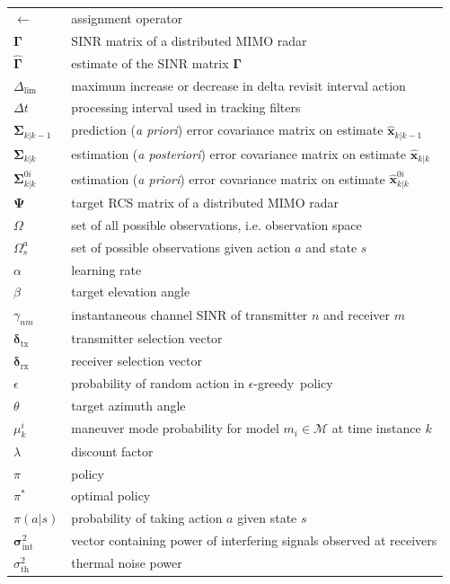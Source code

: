 \documentclass[english, 12pt, a4paper, elec, utf8, a-1b, online]{aaltothesis}
\numberwithin{equation}{section}
\renewcommand{\vec}[1]{\mathbf{#1}}
\newcommand{\Os}{\Omega}
\newcommand{\egreedy}{$\epsilon$-greedy~}
\newcommand{\xprior}{\hat{\vec{x}}_{k|k-1}}
\newcommand{\xpost}{\hat{\vec{x}}_{k|k}}
\newcommand{\priorecov}{\boldsymbol{\Sigma}_{k|k-1}}
\newcommand{\postecov}{\boldsymbol{\Sigma}_{k|k}}
\newcommand{\modeprob}{\mu_k^i}
\newcommand{\xmxinitcurr}{\hat{\vec{x}}^{0i}_{k|k}}
\newcommand{\ecovmxinitcurr}{\bm{\Sigma}^{0i}_{k|k}}
\newcommand{\deltalim}{\Delta_\text{lim}}
\def\prior{\textit{a priori}}
\def\post{\textit{a posteriori}}
\newcommand{\mimm}{\mathcal{M}}
\newcommand{\dt}{\Delta t}
\newcommand{\thnoise}{\sigma^2_{\text{th}}}
\newcommand{\vintnoise}{\boldsymbol{\sigma}^2_{\text{int}}}
\newcommand{\esinr}{\gamma_{{nm}}}
\newcommand{\vsinrexp}{\boldsymbol{\Gamma}}
\newcommand{\vsinrb}{\widehat{\boldsymbol{\Gamma}}}
\newcommand{\vrcs}{\boldsymbol{\Psi}}
\newcommand{\vasvtx}{\boldsymbol{\delta}_{\text{tx}}}
\newcommand{\vasvrx}{\boldsymbol{\delta}_{\text{rx}}}
\begin{document}
\begin{longtable}[l]{ll}
$\leftarrow$ & assignment operator \\
$\vsinrexp$ & SINR matrix of a distributed MIMO radar \\
$\vsinrb$ & estimate of the SINR matrix $\vsinrexp$ \\
$\deltalim$ & maximum increase or decrease in delta revisit interval action \\
$\dt$ & processing interval used in tracking filters \\
$\priorecov$ & prediction (\prior{}) error covariance matrix on estimate $\xprior$ \\
$\postecov$ & estimation (\post{}) error covariance matrix on estimate $\xpost$ \\
$\ecovmxinitcurr$ & estimation (\prior{}) error covariance matrix on estimate $\xmxinitcurr$\\
$\vrcs$ & target RCS matrix of a distributed MIMO radar \\
$\Os$ & set of all possible observations, i.e. observation space \\
$\Os_s^a$ & set of possible observations given action $a$ and state $s$ \\
$\alpha$ & learning rate \\
$\beta$ & target elevation angle \\
$\esinr$ & instantaneous channel SINR of transmitter $n$ and receiver $m$ \\
$\vasvtx$ & transmitter selection vector \\
$\vasvrx$ & receiver selection vector \\
$\epsilon$ & probability of random action in \egreedy policy \\
$\theta$ & target azimuth angle \\
$\modeprob$ & maneuver mode probability for model $m_i \in \mimm$ at time instance $k$ \\
$\lambda$ & discount factor \\
$\pi$ & policy \\
$\pi^*$ & optimal policy \\
$\pi(a|s)$ & probability of taking action $a$ given state $s$ \\
$\vintnoise$ & vector containing power of interfering signals observed at receivers \\
$\thnoise$ & thermal noise power \\

\end{longtable}
\end{document}
